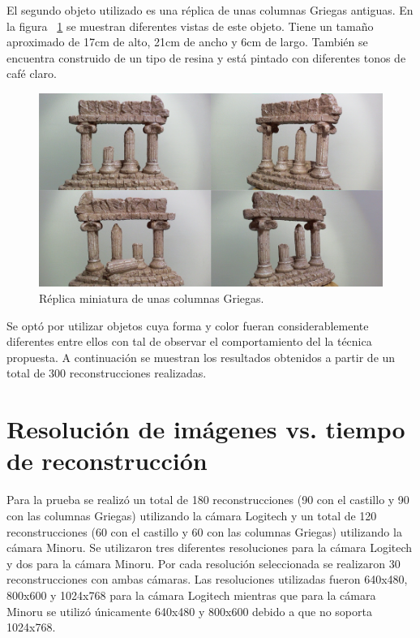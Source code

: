 El segundo objeto utilizado es una r\'{e}plica de unas columnas Griegas antiguas. En la figura ~\ref{fig:ResultsColumns} se muestran diferentes vistas de este objeto. Tiene un tama\~no aproximado de 17cm de alto, 21cm de ancho y 6cm de largo. Tambi\'{e}n se encuentra construido de un tipo de resina y est\'{a} pintado con diferentes tonos de caf\'{e} claro.


\begin{figure}[H]
\centering
\includegraphics[width=1.0\textwidth]{images/greekcolumns.png}
\caption[R\'{e}plica miniatura de unas columnas Griegas]%
{R\'{e}plica miniatura de unas columnas Griegas.}
\label{fig:ResultsColumns}
\end{figure}

Se opt\'{o} por utilizar objetos cuya forma y color fueran considerablemente diferentes entre ellos con tal de observar el comportamiento del la t\'{e}cnica propuesta. A continuaci\'{o}n se muestran los resultados obtenidos a partir de un total de 300 reconstrucciones realizadas.


\section{Resoluci\'{o}n de im\'{a}genes vs. tiempo de reconstrucci\'{o}n}
Para la prueba se realiz\'{o} un total de 180 reconstrucciones (90 con el castillo y 90 con las columnas Griegas) utilizando la c\'{a}mara Logitech y un total de 120 reconstrucciones (60 con el castillo y 60 con las columnas Griegas) utilizando la c\'{a}mara Minoru. Se utilizaron tres diferentes resoluciones para la c\'{a}mara Logitech y dos para la c\'{a}mara Minoru. Por cada resoluci\'{o}n seleccionada se realizaron 30 reconstrucciones con ambas c\'{a}maras. Las resoluciones utilizadas fueron 640x480, 800x600 y 1024x768 para la c\'{a}mara Logitech mientras que para la c\'{a}mara Minoru se utiliz\'{o} \'{u}nicamente 640x480 y 800x600 debido a que no soporta 1024x768.

